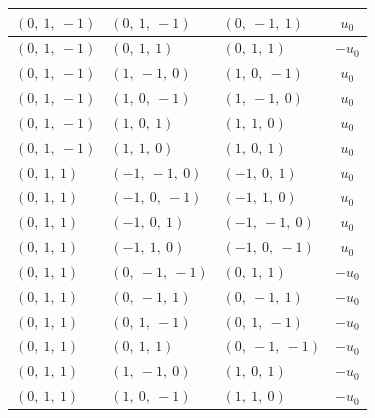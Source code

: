 \documentclass[11pt]{article}
\theoremstyle{definition}
\begin{document}
\begin{longtable}{|l|l|l|c|}
    \hline
    $\left( 0, \  1, \  -1\right)$ & $\left( 0, \  1, \  -1\right)$ & $\left( 0, \  -1, \  1\right)$ & $u_{0}$ \\
    \hline
    $\left( 0, \  1, \  -1\right)$ & $\left( 0, \  1, \  1\right)$ & $\left( 0, \  1, \  1\right)$ & $- u_{0}$ \\
    \hline
    $\left( 0, \  1, \  -1\right)$ & $\left( 1, \  -1, \  0\right)$ & $\left( 1, \  0, \  -1\right)$ & $u_{0}$ \\
    \hline
    $\left( 0, \  1, \  -1\right)$ & $\left( 1, \  0, \  -1\right)$ & $\left( 1, \  -1, \  0\right)$ & $u_{0}$ \\
    \hline
    $\left( 0, \  1, \  -1\right)$ & $\left( 1, \  0, \  1\right)$ & $\left( 1, \  1, \  0\right)$ & $u_{0}$ \\
    \hline
    $\left( 0, \  1, \  -1\right)$ & $\left( 1, \  1, \  0\right)$ & $\left( 1, \  0, \  1\right)$ & $u_{0}$ \\
    \hline
    $\left( 0, \  1, \  1\right)$ & $\left( -1, \  -1, \  0\right)$ & $\left( -1, \  0, \  1\right)$ & $u_{0}$ \\
    \hline
    $\left( 0, \  1, \  1\right)$ & $\left( -1, \  0, \  -1\right)$ & $\left( -1, \  1, \  0\right)$ & $u_{0}$ \\
    \hline
    $\left( 0, \  1, \  1\right)$ & $\left( -1, \  0, \  1\right)$ & $\left( -1, \  -1, \  0\right)$ & $u_{0}$ \\
    \hline
    $\left( 0, \  1, \  1\right)$ & $\left( -1, \  1, \  0\right)$ & $\left( -1, \  0, \  -1\right)$ & $u_{0}$ \\
    \hline
    $\left( 0, \  1, \  1\right)$ & $\left( 0, \  -1, \  -1\right)$ & $\left( 0, \  1, \  1\right)$ & $- u_{0}$ \\
    \hline
    $\left( 0, \  1, \  1\right)$ & $\left( 0, \  -1, \  1\right)$ & $\left( 0, \  -1, \  1\right)$ & $- u_{0}$ \\
    \hline
    $\left( 0, \  1, \  1\right)$ & $\left( 0, \  1, \  -1\right)$ & $\left( 0, \  1, \  -1\right)$ & $- u_{0}$ \\
    \hline
    $\left( 0, \  1, \  1\right)$ & $\left( 0, \  1, \  1\right)$ & $\left( 0, \  -1, \  -1\right)$ & $- u_{0}$ \\
    \hline
    $\left( 0, \  1, \  1\right)$ & $\left( 1, \  -1, \  0\right)$ & $\left( 1, \  0, \  1\right)$ & $- u_{0}$ \\
    \hline
    $\left( 0, \  1, \  1\right)$ & $\left( 1, \  0, \  -1\right)$ & $\left( 1, \  1, \  0\right)$ & $- u_{0}$ \\

\end{longtable}
\end{document}
